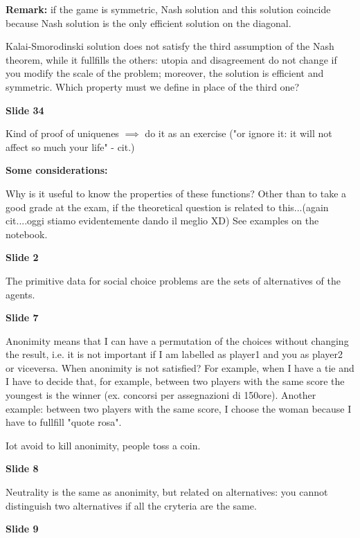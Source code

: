 \noindent \textbf{Remark:} if the game is symmetric, Nash solution and this 
solution coincide because Nash solution is the only efficient solution on the 
diagonal.

\noindent Kalai-Smorodinski solution does not satisfy the third assumption of 
the Nash theorem, while it fullfills the others: utopia and disagreement do not 
change if you modify the scale of the problem; moreover, the solution is 
efficient and symmetric. Which property must we define in place of the third 
one?

\bigskip
\noindent \textbf{Slide 34}

\noindent Kind of proof of uniquenes $\implies$ do it as an exercise {(\huge "or 
ignore it: it will not affect so much your life" - cit.)}

\bigskip
\noindent \textbf{Some considerations:}

\noindent Why is it useful to know the properties of these functions? 
{\huge Other than to take a good grade at the exam, if the theoretical question 
is related to this...(again cit....oggi stiamo evidentemente dando il meglio 
XD)} 
See examples on the notebook.

\bigskip
{}

\bigskip
\noindent \textbf{Slide 2}

\noindent The primitive data for social choice problems are the sets of 
alternatives of the agents. 

\bigskip
\noindent \textbf{Slide 7}

\noindent Anonimity means that I can have a permutation of the choices without 
changing the result, i.e. it is not important if I am labelled as player1 and 
you as player2 or viceversa. When anonimity is not satisfied? For example, 
when I have a tie and I have to decide that, for example, between two players 
with the same score the youngest is the winner (ex. concorsi per assegnazioni di 
150ore). Another example: between two players with the same score, I choose the 
woman because I have to fullfill "quote rosa".

\noindent Iot avoid to kill anonimity, people toss a coin.

\bigskip
\noindent \textbf{Slide 8}

\noindent Neutrality is the same as anonimity, but related on alternatives: you 
cannot distinguish two alternatives if all the cryteria are the same. 

\bigskip
\noindent \textbf{Slide 9}

